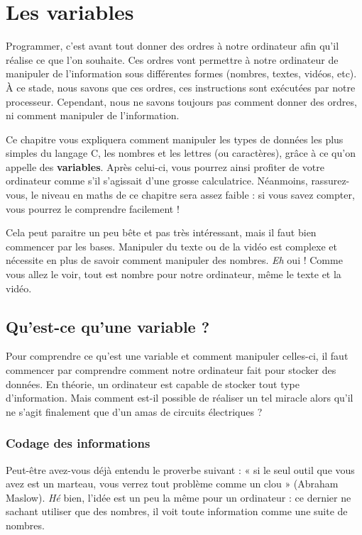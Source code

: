 \chapter{Les variables}

Programmer, c'est avant tout donner des ordres à
notre ordinateur afin qu'il réalise ce que l'on souhaite. Ces ordres
vont permettre à notre ordinateur de manipuler de l'information sous
différentes formes (nombres, textes, vidéos, etc). À ce stade, nous
savons que ces ordres, ces instructions sont exécutées par notre
processeur. Cependant, nous ne savons toujours pas comment donner des
ordres, ni comment manipuler de l'information.

Ce chapitre vous expliquera comment manipuler les types de données les
plus simples du langage C, les nombres et les lettres (ou caractères),
grâce à ce qu'on appelle des \textbf{variables}. Après celui-ci, vous
pourrez ainsi profiter de votre ordinateur comme s'il s'agissait d'une
grosse calculatrice. Néanmoins, rassurez-vous, le niveau en maths de ce
chapitre sera assez faible : si vous savez compter, vous pourrez le
comprendre facilement !

Cela peut paraitre un peu bête et pas très intéressant, mais il faut
bien commencer par les bases. Manipuler du texte ou de la vidéo est
complexe et nécessite en plus de savoir comment manipuler des nombres.
\emph{Eh} oui ! Comme vous allez le voir, tout est nombre pour notre
ordinateur, même le texte et la vidéo.

\section{Qu’est-ce qu’une variable ?}

Pour comprendre ce qu'est une variable et comment manipuler celles-ci,
il faut commencer par comprendre comment notre ordinateur fait pour
stocker des données. En théorie, un ordinateur est capable de stocker
tout type d'information. Mais comment est-il possible de réaliser un
tel miracle alors qu'il ne s'agit finalement que d'un amas de circuits
électriques ?

\subsection{Codage des informations}\label{codage-des-informations}

Peut-être avez-vous déjà entendu le proverbe suivant : « si le seul
outil que vous avez est un marteau, vous verrez tout problème comme un
clou » (Abraham Maslow). \emph{Hé} bien, l'idée est un peu la même
pour un ordinateur : ce dernier ne sachant utiliser que des nombres,
il voit toute information comme une suite de nombres.

